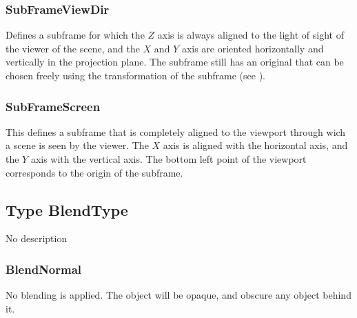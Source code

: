\subsubsection{SubFrameViewDir \label{T:SubFrameType|SubFrameViewDir}}
Defines a subframe for which the $Z$ axis is always aligned to the light of sight of the viewer of the scene, and the $X$ and $Y$ axis are oriented horizontally and vertically in the projection plane. The subframe still has an original that can be chosen freely using the transformation of the subframe (see ).

\subsubsection{SubFrameScreen \label{T:SubFrameType|SubFrameScreen}}
This defines a subframe that is completely aligned to the viewport through wich a scene is seen by the viewer. The $X$ axis is aligned with the horizontal axis, and the $Y$ axis with the vertical axis. The bottom left point of the viewport corresponds to the origin of the subframe.

\subsection{Type BlendType \label{T:BlendType}}
No description

\subsubsection{BlendNormal \label{T:BlendType|BlendNormal}}
No blending is applied. The object will be opaque, and obscure any object behind it.

